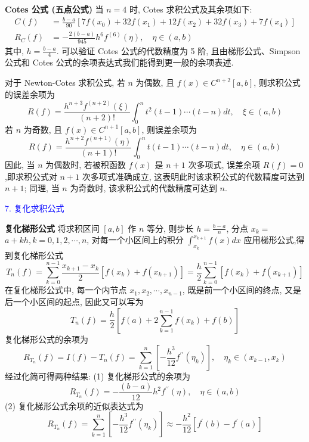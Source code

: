 \textbf{Cotes 公式 (五点公式)} 当 $ n=4 $ 时, Cotes 求积公式及其余项如下:
$$
\begin{aligned}
C(f)&=\frac{b-a}{90}\left[7 f\left(x_{0}\right)+32 f\left(x_{1}\right)+12 f\left(x_{2}\right)+32 f\left(x_{3}\right)+7 f\left(x_{4}\right)\right] \\
R_{C}(f)&=-\frac{2(b-a)}{945} h^{6} f^{(6)}(\eta), \quad \eta \in(a, b)
\end{aligned}
$$
其中, $ h=\frac{b-a}{4} $.
可以验证 Cotes 公式的代数精度为 5 阶, 且由梯形公式、Simpson 公式和 Cotes 公式的余项表达式我们能得到更一般的余项表述.

对于 Newton-Cotes 求积公式, 若 $ n $ 为偶数, 且 $ f(x) \in C^{n+2}[a, b] $, 则求积公式的误差余项为
$$
R(f)=\frac{h^{n+3} f^{(n+2)}(\xi)}{(n+2)!} \int_{0}^{n} t^{2}(t-1) \cdots(t-n) d t, \quad \xi \in(a, b)
$$
若 $ n $ 为奇数, 且 $ f(x) \in C^{n+1}[a, b] $, 则误差余项为
$$
R(f)=\frac{h^{n+2} f^{(n+1)}(\eta)}{(n+1)!} \int_{0}^{n} t(t-1) \cdots(t-n) d t, \quad \eta \in(a, b)
$$
因此, 当 $ n $ 为偶数时, 若被积函数 $ f(x) $ 是 $ n+1 $ 次多项式, 误差余项 $ R(f)=0 $,即求积公式对 $ n+1 $ 次多项式准确成立, 这表明此时该求积公式的代数精度可达到 $ n+1 $; 同理, 当 $ n $ 为奇数时, 该求积公式的代数精度可达到 $ n $.

\textcolor{blue}{7. 复化求积公式}

\textbf{复化梯形公式} \; 将求积区间 $ [a, b] $ 作 $ n $ 等分, 则步长 $ h=\frac{b-a}{n} $, 分点 $ x_{k}= $ $ a+k h, k=0,1,2, \cdots, n $, 对每一个小区间上的积分 $\displaystyle \int_{x_{k}}^{x_{k+1}} f(x) d x $ 应用梯形公式,得到复化梯形公式
$$
T_{n}(f)=\sum_{k=0}^{n-1} \frac{x_{k+1}-x_{k}}{2}\left[f\left(x_{k}\right)+f\left(x_{k+1}\right)\right]=\frac{h}{2} \sum_{k=0}^{n-1}\left[f\left(x_{k}\right)+f\left(x_{k+1}\right)\right]
$$
在复化梯形公式中, 每一个内节点 $ x_{1}, x_{2}, \cdots, x_{n-1} $, 既是前一个小区间的终点, 又是后一个小区间的起点, 因此又可以写为
$$
T_{n}(f)=\frac{h}{2}\left[f(a)+2 \sum_{k=1}^{n-1} f\left(x_{k}\right)+f(b)\right]
$$
复化梯形公式的余项为
$$
R_{T_{n}}(f)=I(f)-T_{n}(f)=\sum_{k=1}^{n}\left[-\frac{h^{3}}{12} f^{\prime \prime}\left(\eta_{k}\right)\right], \quad \eta_{k} \in\left(x_{k-1}, x_{k}\right)
$$
经过化简可得两种结果:
(1) 复化梯形公式的余项为
$$
R_{T_{n}}(f)=-\frac{(b-a)}{12} h^{2} f^{\prime \prime}(\eta), \quad \eta \in(a, b)
$$
(2) 复化梯形公式余项的近似表达式为
$$
R_{T_{n}}(f)=\sum_{k=1}^{n}\left[-\frac{h^{3}}{12} f^{\prime \prime}\left(\eta_{k}\right)\right] \approx-\frac{h^{2}}{12}\left[f^{\prime}(b)-f^{\prime}(a)\right]
$$


